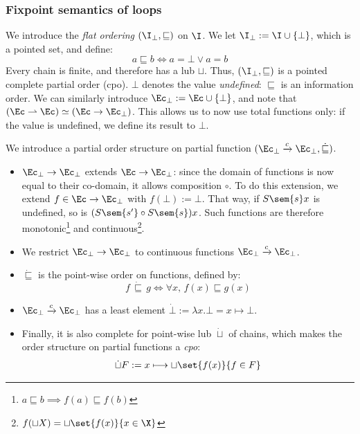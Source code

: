 \documentclass[toc]{../cs-classes/cs-classes}
\begin{document}
\subsubsection{Fixpoint semantics of loops} 
\begin{definition}
    We introduce the \emph{flat ordering} $(\I_\bot, \sqsubseteq)$ on $\I$. We let $\I_\bot := \I\cup\{\bot\}$, which is a pointed set, and define:
    \begin{equation*}
        a\sqsubseteq b \iff a = \bot \lor a=b
    \end{equation*}
    Every chain is finite, and therefore has a lub $\sqcup$. Thus, $(\I_\bot, \sqsubseteq)$ is a pointed complete partial order (cpo). 
    $\bot$ denotes the value \emph{undefined}: $\sqsubseteq$ is an information order. We can similarly introduce $\Ec_\bot := \Ec\cup\{\bot\}$, and note that $(\Ec\rightharpoonup\Ec) \simeq (\Ec\rightarrow\Ec_\bot)$. This allows us to now use total functions only: if the value is undefined, we define its result to $\bot$.
\end{definition}

\begin{definition}
    We introduce a partial order structure on partial function $(\Ec_\bot\xrightarrow{c}\Ec_\bot, \dot{\sqsubseteq})$.
    \begin{itemize}
        \item $\Ec_\bot\rightarrow\Ec_\bot$ extends $\Ec\rightarrow\Ec_\bot$: since the domain of functions is now equal to their co-domain, it allows composition $\circ$. To do this extension, we extend $f\in\Ec\rightarrow\Ec_\bot$ with $f(\bot):=\bot$. That way, if $S\sem{s}x$ is undefined, so is $(S\sem{s'}\circ S\sem{s})x$. Such functions are therefore monotonic\footnote{$a\sqsubseteq b\implies f(a)\sqsubseteq f(b)$} and continuous\footnote{$f(\sqcup X)=\sqcup\set{f(x)}{x\in\X}$}.
        \item We restrict $\Ec_\bot\rightarrow\Ec_\bot$ to continuous functions $\Ec_\bot\xrightarrow{c}\Ec_\bot$.
        \item $\dot{\sqsubseteq}$ is the point-wise order on functions, defined by:
        \begin{equation*}
            f\,\dot{\sqsubseteq}\,g \iff \forall x, \, f(x)\sqsubseteq g(x)
        \end{equation*}
        \item $\Ec_\bot\xrightarrow{c}\Ec_\bot$ has a least element $\dot{\bot} := \lambda x.\bot = x \mapsto \bot$.
        \item Finally, it is also complete for point-wise lub $\dot{\sqcup}$ of chains, which makes the order structure on partial functions a \emph{cpo}:
        \begin{equation*}
            \dot{\sqcup}F := x \longmapsto \sqcup\set{f(x)}{f\in F}
        \end{equation*}
    \end{itemize}
\end{definition}
\end{document}

